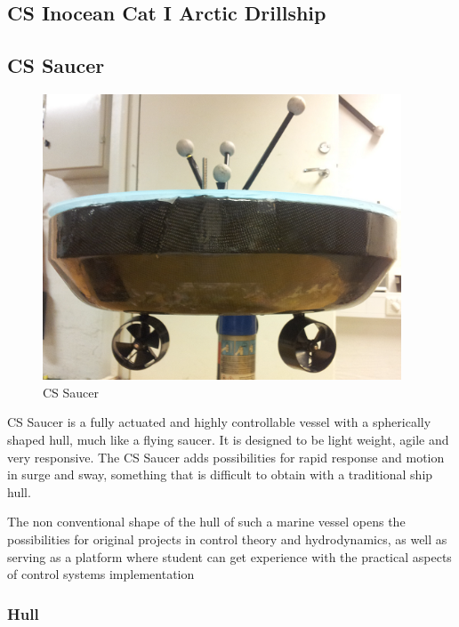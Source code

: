 \documentclass[a4paper,twoside,english]{report}
\begin{document}
\subsection{CS Inocean Cat I Arctic Drillship}


\clearpage{}

\subsection{CS Saucer}

\begin{figure}
\centering \includegraphics[width=0.95\textwidth]{fig/CSSaucer} 
\caption{CS Saucer}
\label{fig: CS Saucer}
\end{figure}

CS Saucer is a fully actuated and highly controllable vessel with
a spherically shaped hull, much like a flying saucer. It is designed
to be light weight, agile and very responsive. The CS Saucer adds
possibilities for rapid response and motion in surge and sway, something
that is difficult to obtain with a traditional ship hull. 

The non conventional shape of the hull of such a marine vessel opens
the possibilities for original projects in control theory and hydrodynamics,
as well as serving as a platform where student can get experience
with the practical aspects of control systems implementation

\subsubsection{Hull}
\end{document}

